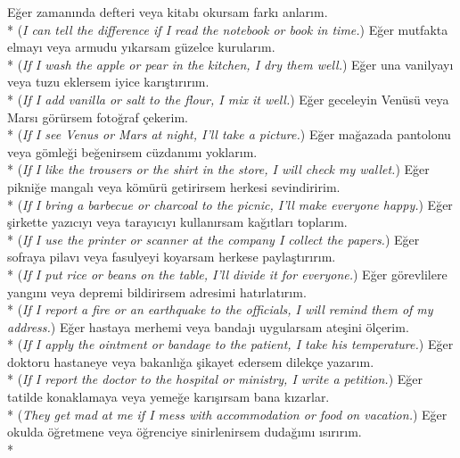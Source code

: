 \ea E\u{g}er zaman{\i}nda defteri veya kitab{\i} okursam fark{\i} anlar{\i}m. \\*
({\it I can tell the difference if I read the notebook or book in time.})
\ex E\u{g}er mutfakta elmay{\i} veya armudu y{\i}karsam g\"{u}zelce kurular{\i}m. \\*
({\it If I wash the apple or pear in the kitchen, I dry them well.})
\ex E\u{g}er una vanilyay{\i} veya tuzu eklersem iyice kar{\i}\c{s}t{\i}r{\i}r{\i}m. \\*
({\it If I add vanilla or salt to the flour, I mix it well.})
\ex E\u{g}er geceleyin Ven\"{u}s\"{u} veya Mars{\i} g\"{o}r\"{u}rsem foto\u{g}raf \c{c}ekerim. \\*
({\it If I see Venus or Mars at night, I'll take a picture.})
\ex E\u{g}er ma\u{g}azada pantolonu veya g\"{o}mle\u{g}i be\u{g}enirsem c\"{u}zdan{\i}m{\i} yoklar{\i}m. \\*
({\it If I like the trousers or the shirt in the store, I will check my wallet.})
\ex E\u{g}er pikni\u{g}e mangal{\i} veya k\"{o}m\"{u}r\"{u} getirirsem herkesi sevindiririm. \\*
({\it If I bring a barbecue or charcoal to the picnic, I'll make everyone happy.})
\ex E\u{g}er \c{s}irkette yaz{\i}c{\i}y{\i} veya taray{\i}c{\i}y{\i} kullan{\i}rsam ka\u{g}{\i}tlar{\i} toplar{\i}m. \\*
({\it If I use the printer or scanner at the company I collect the papers.})
\ex E\u{g}er sofraya pilav{\i} veya fasulyeyi koyarsam herkese payla\c{s}t{\i}r{\i}r{\i}m. \\*
({\it If I put rice or beans on the table, I'll divide it for everyone.})
\ex E\u{g}er g\"{o}revlilere yang{\i}n{\i} veya depremi bildirirsem adresimi hat{\i}rlat{\i}r{\i}m. \\*
({\it If I report a fire or an earthquake to the officials, I will remind them of my address.})
\ex E\u{g}er hastaya merhemi veya bandaj{\i} uygularsam ate\c{s}ini \"{o}l\c{c}erim. \\*
({\it If I apply the ointment or bandage to the patient, I take his temperature.})
\ex E\u{g}er doktoru hastaneye veya bakanl{\i}\u{g}a \c{s}ikayet edersem dilek\c{c}e yazar{\i}m. \\*
({\it If I report the doctor to the hospital or ministry, I write a petition.})
\ex E\u{g}er tatilde konaklamaya veya yeme\u{g}e kar{\i}\c{s}{\i}rsam bana k{\i}zarlar. \\*
({\it They get mad at me if I mess with accommodation or food on vacation.})
\ex E\u{g}er okulda \"{o}\u{g}retmene veya \"{o}\u{g}renciye sinirlenirsem duda\u{g}{\i}m{\i} {\i}s{\i}r{\i}r{\i}m. \\*
